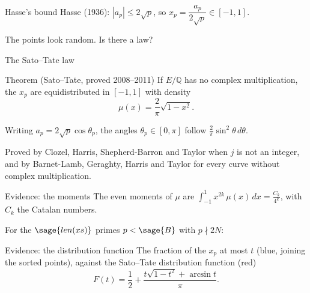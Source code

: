 \documentclass{beamer}
\begin{document}
\begin{frame}{Hasse's bound}
  Hasse (1936): \quad $|a_p| \le 2\sqrt{p}$, \quad so \quad $x_p = \dfrac{a_p}{2\sqrt{p}} \in [-1, 1]$.
  \pause
  \begin{center}
  \end{center}
  \pause
  The points look random. Is there a law?
\end{frame}

\begin{frame}{The Sato--Tate law}
  \begin{block}{Theorem (Sato--Tate, proved 2008--2011)}
    If $E/\mathbb{Q}$ has no complex multiplication, the $x_p$ are equidistributed in $[-1, 1]$ with density
    \[ \mu(x) = \frac{2}{\pi}\sqrt{1 - x^2}. \]
  \end{block}
  \pause
  Writing $a_p = 2\sqrt{p}\cos\theta_p$, the angles $\theta_p \in [0, \pi]$ follow $\frac{2}{\pi}\sin^2\theta\,d\theta$.
  \pause
  \medskip

  Proved by Clozel, Harris, Shepherd-Barron and Taylor when $j$ is not an integer, and by Barnet-Lamb,
  Geraghty, Harris and Taylor for every curve without complex multiplication.
\end{frame}

\begin{frame}{Evidence: the moments}
  The even moments of $\mu$ are $\displaystyle\int_{-1}^{1} x^{2k}\,\mu(x)\,dx = \frac{C_k}{4^k}$, with $C_k$ the Catalan numbers.
  \pause
  \medskip

  For the $\sage{len(xs)}$ primes $p < \sage{B}$ with $p \nmid 2N$:
  \begin{center}
  \end{center}
\end{frame}

\begin{frame}{Evidence: the distribution function}
  The fraction of the $x_p$ at most $t$ (blue, joining the sorted points), against the Sato--Tate distribution function (red)
  \[ F(t) = \frac12 + \frac{t\sqrt{1 - t^2} + \arcsin t}{\pi}. \]
  \begin{center}
  \end{center}
\end{frame}
\end{document}
